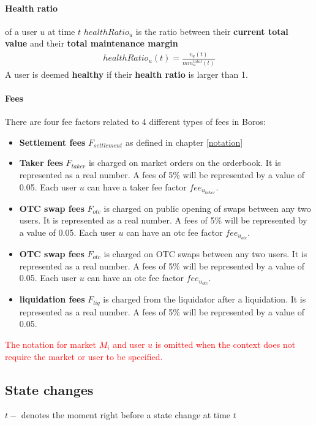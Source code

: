 \documentclass{article}%
\begin{document}
\paragraph{Health ratio} of a user $u$ at time $t$ $healthRatio_u$ is the ratio between their \textbf{current total value} and their \textbf{total maintenance margin}
    \begin{align*}
        healthRatio_u(t) = \frac{ v_u(t) }{mm^{total}_{u}(t)}
    \end{align*}
A user is deemed \textbf{healthy} if their \textbf{health ratio} is larger than 1.

\paragraph{Fees} There are four fee factors related to 4 different types of fees in Boros:
\begin{itemize}
    \item \textbf{Settlement fees} $F_{settlement}$ as defined in chapter \ref{notation}
    \item \textbf{Taker fees} $F_{taker}$ is charged on market orders on the orderbook. It is represented as a real number. A fees of 5\% will be represented by a value of 0.05. Each user $u$ can have a taker fee factor $fee_{u_{taker}}$.
    \item \textbf{OTC swap fees} $F_{otc}$ is charged on public opening of swaps between any two users. It is represented as a real number. A fees of 5\% will be represented by a value of 0.05. Each user $u$ can have an otc fee factor $fee_{u_{otc}}$.\item \textbf{OTC swap fees} $F_{otc}$ is charged on OTC swaps between any two users. It is represented as a real number. A fees of 5\% will be represented by a value of 0.05. Each user $u$ can have an otc fee factor $fee_{u_{otc}}$.
    \item \textbf{liquidation fees} $F_{liq}$ is charged from the liquidator after a liquidation. It is represented as a real number. A fees of 5\% will be represented by a value of 0.05.
\end{itemize}

\textcolor{red}{The notation for market $M_i$ and user $u$ is omitted when the context does not require the market or user to be specified.}

\subsection{State changes}
$t-$ denotes the moment right before a state change at time $t$
\end{document}
